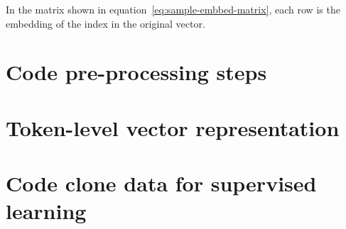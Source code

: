In the matrix shown in equation~\ref{eq:sample-embbed-matrix}, each row is the
embedding of the index in the original vector.
\section{\label{sec:preprocessing}Code pre-processing steps}
%
\section{\label{sec:token-representation}Token-level vector representation}
%
\section{\label{sec:code-clone-data}Code clone data for supervised learning}
